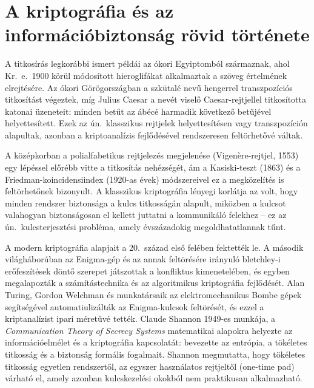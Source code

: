 \section{A kriptográfia és az információbiztonság rövid története}

A titkosírás legkorábbi ismert példái az ókori Egyiptomból származnak, ahol Kr.\ e.\ 1900 körül
módosított hieroglifákat alkalmaztak a szöveg értelmének elrejtésére. Az ókori Görögországban a
szkütalé nevű hengerrel transzpozíciós titkosítást végeztek, míg Julius Caesar a nevét viselő
Caesar-rejtjellel titkosította katonai üzeneteit: minden betűt az ábécé harmadik következő betűjével
helyettesített. Ezek az ún.\ klasszikus rejtjelek helyettesítésen vagy transzpozíción alapultak, azonban
a kriptoanalízis fejlődésével rendszeresen feltörhetővé váltak.

A középkorban a polialfabetikus rejtjelezés megjelenése (Vigenère-rejtjel, 1553) egy lépéssel
előrébb vitte a titkosítás nehézségét, ám a Kasiski-teszt (1863) és a Friedman-koincidensiindex
(1920-as évek) módszereivel ez a megközelítés is feltörhetőnek bizonyult. A klasszikus kriptográfia
lényegi korlátja az volt, hogy minden rendszer biztonsága a kulcs titkosságán alapult, miközben a
kulcsot valahogyan biztonságosan el kellett juttatni a kommunikáló felekhez -- ez az ún.\ kulcsterjesztési
probléma, amely évszázadokig megoldhatatlannak tűnt.

A modern kriptográfia alapjait a 20.\ század első felében fektették le. A második világháborúban az
Enigma-gép és az annak feltörésére irányuló bletchley-i erőfeszítések döntő szerepet játszottak a
konfliktus kimenetelében, és egyben megalapozták a számítástechnika és az algoritmikus kriptográfia
fejlődését. Alan Turing, Gordon Welchman és munkatársaik az elektromechanikus Bombe gépek
segítségével automatiulizálták az Enigma-kulcsok feltörését, és ezzel a kriptanalízist ipari méretűvé
tették. Claude Shannon 1949-es munkája, a \textit{Communication Theory of Secrecy Systems}
matematikai alapokra helyezte az információelmélet és a kriptográfia kapcsolatát: bevezette az
entrópia, a tökéletes titkosság és a biztonság formális fogalmait. Shannon
megmutatta, hogy tökéletes titkosság egyetlen rendszertől, az egyszer használatos rejtjeltől
(one-time pad) várható el, amely azonban kulcskezelési okokból nem praktikusan alkalmazható.

